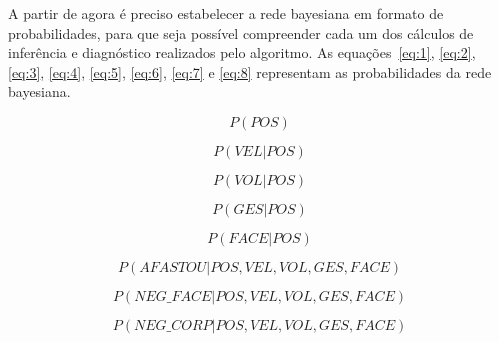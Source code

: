 A partir de agora é preciso estabelecer a rede bayesiana em formato de probabilidades, para que seja possível compreender cada um dos cálculos de inferência e diagnóstico realizados pelo algoritmo. As equações~\ref{eq:1}, \ref{eq:2}, \ref{eq:3}, \ref{eq:4}, \ref{eq:5}, \ref{eq:6}, \ref{eq:7} e \ref{eq:8} representam as probabilidades da rede bayesiana.

\begin{equation}
	\label{eq:1}
	P(POS)
\end{equation}

\begin{equation}
	\label{eq:2}
	P(VEL|POS)
\end{equation}

\begin{equation}
	\label{eq:3}
	P(VOL|POS)
\end{equation}

\begin{equation}
	\label{eq:4}
	P(GES|POS)
\end{equation}

\begin{equation}
	\label{eq:5}
	P(FACE|POS)
\end{equation}

\begin{equation}
	\label{eq:6}
	P(AFASTOU|POS, VEL, VOL, GES, FACE)
\end{equation}

\begin{equation}
	\label{eq:7}
	P(NEG\_FACE|POS, VEL, VOL, GES, FACE)
\end{equation}

\begin{equation}
	\label{eq:8}
	P(NEG\_CORP|POS, VEL, VOL, GES, FACE)
\end{equation}
